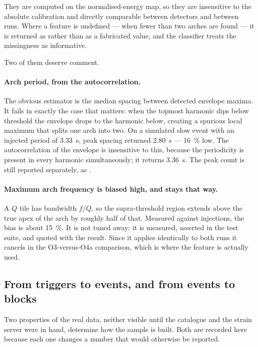 They are computed on the normalised-energy map, so they are insensitive to the
absolute calibration and directly comparable between detectors and between
runs. Where a feature is undefined ---  when fewer than two
arches are found --- it is returned as  rather than as a fabricated
value, and the classifier treats the missingness as informative.

Two of them deserve comment.

\paragraph{Arch period, from the autocorrelation.} The obvious estimator is
the median spacing between detected envelope maxima. It fails in exactly the
case that matters: when the topmost harmonic dips below threshold the envelope
drops to the harmonic below, creating a spurious local maximum that splits one
arch into two. On a simulated slow event with an injected period of
\SI{3.33}{\second}, peak spacing returned \SI{2.80}{\second} --- \SI{16}{\percent}
low. The autocorrelation of the envelope is insensitive to this, because the
periodicity is present in every harmonic simultaneously; it returns
\SI{3.36}{\second}. The peak count is still reported separately, as
.

\paragraph{Maximum arch frequency is biased high, and stays that way.} A $Q$
tile has bandwidth $f/Q$, so the supra-threshold region extends above the true
apex of the arch by roughly half of that. Measured against injections, the
bias is about \SI{15}{\percent}. It is not tuned away: it is measured,
asserted in the test suite, and quoted with the result. Since it applies
identically to both runs it cancels in the O3-versus-O4a comparison, which is
where the feature is actually used.

\subsection{From triggers to events, and from events to blocks}
\label{sec:methods:sampling}

Two properties of the real data, neither visible until the catalogue and the
strain server were in hand, determine how the sample is built. Both are
recorded here because each one changes a number that would otherwise be
reported.


